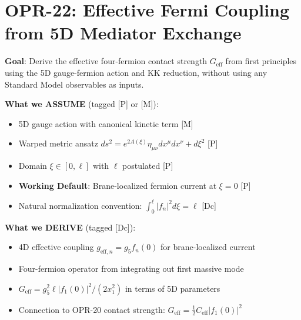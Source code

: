 
\chapter{OPR-22: Effective Fermi Coupling from 5D Mediator Exchange}
\label{ch:opr22_geff}


\begin{tcolorbox}[colback=blue!5!white, colframe=blue!50!black,
    title=\textbf{Reader's Map: What This Chapter Does and Does Not Claim}]

\textbf{Goal}: Derive the effective four-fermion contact strength $G_{\text{eff}}$ from
first principles using the 5D gauge-fermion action and KK reduction, without using
any Standard Model observables as inputs.

\medskip

\textbf{What we ASSUME} (tagged [P] or [M]):
\begin{itemize}
    \item 5D gauge action with canonical kinetic term [M]
    \item Warped metric ansatz $ds^2 = e^{2A(\xi)} \eta_{\mu\nu} dx^\mu dx^\nu + d\xi^2$ [P]
    \item Domain $\xi \in [0, \ell]$ with $\ell$ postulated [P]
    \item \textbf{Working Default}: Brane-localized fermion current at $\xi = 0$ [P]
    \item Natural normalization convention: $\int_0^\ell |f_n|^2 d\xi = \ell$ [Dc]
\end{itemize}

\textbf{What we DERIVE} (tagged [Dc]):
\begin{itemize}
    \item 4D effective coupling $g_{\text{eff},n} = g_5 f_n(0)$ for brane-localized current
    \item Four-fermion operator from integrating out first massive mode
    \item $G_{\text{eff}} = g_5^2 \ell |f_1(0)|^2 / (2 x_1^2)$ in terms of 5D parameters
    \item Connection to OPR-20 contact strength: $G_{\text{eff}} = \frac{1}{2} C_{\text{eff}} |f_1(0)|^2$
\end{itemize}


\end{tcolorbox}
